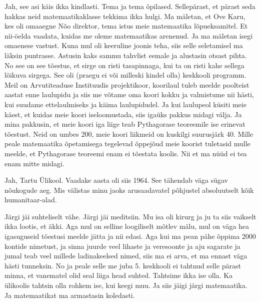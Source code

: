 
Jah, see asi käis ikka kindlasti. Tema ja tema õpilased. Sellepärast, et pärast 
seda hakkas neid matemaatikaklasse tekkima ikka hulgi. Ma mäletan, et Ove 
Karu, kes oli omaaegne Nõo direktor, 
tema istus meie matemaatika lõpueksamitel. Et nii-öelda vaadata, kuidas me 
oleme matemaatikas arenenud. Ja ma mäletan isegi omaenese vastust. Kuna mul oli 
keeruline joonis teha, siis selle seletamisel ma läksin puntrasse. Astusin kaks 
sammu tahvlist eemale ja alustasin otsast pihta. No see on see tõestus, et 
sirge on risti tasapinnaga, kui ta on risti kahe sellega lõikuva sirgega. See 
oli (praegu ei või milleski kindel olla) keskkooli programm. Meil on 
Arvutiteaduse Instituudis 
projektikoor, koorilaul tuleb meelde poolteist aastat enne laulupidu ja siis me 
võtame oma koori kokku ja valmistume nii hästi, kui suudame  ettelaulmiseks ja 
käima laulupidudel. Ja kui laulupeol küsiti meie käest, et kuidas meie koori 
iseloomustada, siis igaüks pakkus midagi välja. Ja mina pakkusin, et meie koori 
iga liige teab Pythagorase teoreemile ise erinevat tõestust. Neid on umbes 200, 
meie koori liikmeid on kuskilgi suurusjärk 40. Mille peale matemaatika 
õpetamisega tegelevad õppejõud meie koorist tuletasid mulle meelde, et 
Pythagorase teoreemi enam ei tõestata koolis. Nii et ma nüüd ei tea enam mitte 
midagi.


Jah, Tartu Ülikool. Vaadake aasta oli siis 1964. See 
tähendab väga sügav nõukogude aeg. Mis välistas minu jaoks arusaadavatel 
põhjustel absoluutselt kõik humanitaar-alad. 

Järgi jäi suhteliselt vähe. Järgi jäi meditsiin. Mu isa oli kirurg ja ju ta 
siis vaikselt ikka lootis, et äkki. Aga mul on selline loogiliselt mõtlev mälu, 
mul on väga hea igasuguseid tõestusi meelde jätta ja nii edasi. Aga kui ma pean 
pähe õppima 2000 kontide nimetust, ja sinna juurde veel lihaste ja veresoonte 
ja aju sagarate ja jumal teab veel millede ladinakeelsed nimed, siis ma ei 
arva, et ma ennast väga hästi tunneksin. No ja peale selle me juba 5. keskkooli 
ei tahtnud selle pärast minna, et vanematel olid seal liiga head suhted. 
Tahtsime ikka ise olla. Ka  ülikoolis tahtsin olla rohkem ise, kui keegi muu. 
Ja siis jäigi järgi matemaatika. Ja matemaatikat ma armastasin koledasti. 

